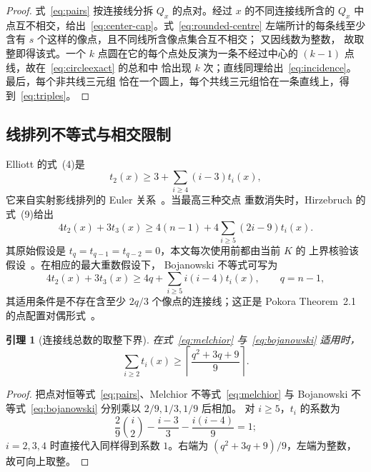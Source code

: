 \documentclass[11pt,a4paper]{ctexart}
\newtheorem{lemma}[theorem]{引理}
\theoremstyle{definition}
\begin{document}
\begin{proof}
式~\eqref{eq:pairs} 按连接线分拆 $Q_x$ 的点对。经过 $x$ 的不同连接线所含的
$Q_x$ 中点互不相交，给出~\eqref{eq:center-cap}。式~\eqref{eq:rounded-centre}
左端所计的每条线至少含有 $s$ 个这样的像点，且不同线所含像点集合互不相交；
又因线数为整数，
故取整即得该式。一个 $k$ 点圆在它的每个点处反演为一条不经过中心的
$(k-1)$ 点线，故在~\eqref{eq:circleexact} 的总和中
恰出现 $k$ 次；直线同理给出~\eqref{eq:incidence}。最后，每个非共线三元组
恰在一个圆上，每个共线三元组恰在一条直线上，得到~\eqref{eq:triples}。
\end{proof}

\subsection{线排列不等式与相交限制}

Elliott 的式~(4)是
\begin{equation}\label{eq:melchior}
t_2(x)\ge3+\sum_{i\ge4}(i-3)t_i(x),
\end{equation}
它来自实射影线排列的 Euler 关系~\cite[Eq.~(4)]{elliott}。当最高三种交点
重数消失时，Hirzebruch 的式~(9)给出
\begin{equation}\label{eq:hirz}
4t_2(x)+3t_3(x)\ge4(n-1)+4\sum_{i\ge5}(2i-9)t_i(x).
\end{equation}
其原始假设是 $t_q=t_{q-1}=t_{q-2}=0$，本文每次使用前都由当前 $K$ 的
上界核验该假设~\cite[\S6, Eq.~(9)]{hirzebruch}。在相应的最大重数假设下，
Bojanowski 不等式可写为
\begin{equation}\label{eq:bojanowski}
4t_2(x)+3t_3(x)\ge4q+\sum_{i\ge5}i(i-4)t_i(x),
\qquad q=n-1,
\end{equation}
其适用条件是不存在含至少 $2q/3$ 个像点的连接线；这正是 Pokora
Theorem~2.1 的点配置对偶形式~\cite[Theorem~2.1]{pokora}。

\begin{lemma}[连接线总数的取整下界]\label{lem:rounded-lines}
在式~\eqref{eq:melchior} 与~\eqref{eq:bojanowski} 适用时，
\begin{equation}\label{eq:rounded-lines}
 \sum_{i\ge2}t_i(x)\ge
 \left\lceil\frac{q^2+3q+9}{9}\right\rceil .
\end{equation}
\end{lemma}

\begin{proof}
把点对恒等式~\eqref{eq:pairs}、Melchior 不等式~\eqref{eq:melchior} 与
Bojanowski 不等式~\eqref{eq:bojanowski} 分别乘以 $2/9,1/3,1/9$ 后相加。
对 $i\ge5$，$t_i$ 的系数为
\[
 \frac{2}{9}\binom i2-\frac{i-3}{3}-\frac{i(i-4)}9=1;
\]
$i=2,3,4$ 时直接代入同样得到系数 $1$。右端为
$(q^2+3q+9)/9$，左端为整数，故可向上取整。
\end{proof}
\end{document}
